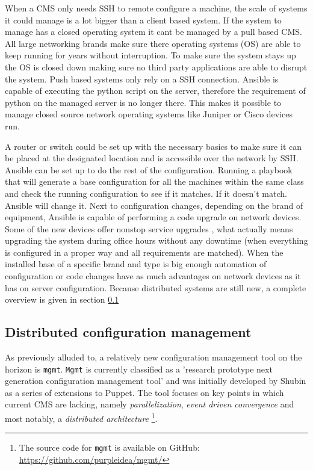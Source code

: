 When a CMS only needs SSH to remote configure a machine, the scale of systems it could manage is a lot bigger than a client based system. If the system to manage has a closed operating system it cant be managed by a pull based CMS. All large networking brands make sure there operating systems (OS) are able to keep running for years without interruption. To make sure the system stays up the OS is closed down making sure no third party applications are able to disrupt the system. Push based systems only rely on a SSH connection. Ansible is capable of executing the python script on the server, therefore the requirement of python on the managed server is no longer there. This makes it possible to manage closed source network operating systems like Juniper or Cisco devices run. 

A router or switch could be set up with the necessary basics to make sure it can be placed at the designated location and is accessible over the network by SSH. Ansible can be set up to do the rest of the configuration. Running a playbook that will generate a base configuration for all the machines within the same class and check the running configuration to see if it matches. If it doesn't match. Ansible will change it. Next to configuration changes, depending on the brand of equipment, Ansible is capable of performing a code upgrade on network devices. Some of the new devices offer nonstop service upgrades \cite{NSSU}\cite{ISSU}, what actually means upgrading the system during office hours without any downtime (when everything is configured in a proper way and all requirements are matched). When the installed base of a specific brand and type is big enough automation of configuration or code changes have as much advantages on network devices as it has on server configuration.  Because distributed systems are still new, a complete overview is given in section \ref{subsec:distributedmgmt}

\subsection{Distributed configuration management}\label{subsec:distributedmgmt}
As previously alluded to, a relatively new configuration management tool on the horizon is \texttt{mgmt}. \texttt{Mgmt} is currently classified as a 'research prototype next generation configuration management tool' and was initially developed by Shubin \cite{shubin2016} as a series of extensions to Puppet. The tool focuses on key points in which current CMS are lacking, namely \textit{parallelization}, \textit{event driven convergence} and most notably, a \textit{distributed architecture} \footnote{The source code for \texttt{mgmt} is available on GitHub: \url{https://github.com/purpleidea/mgmt/}}. 

